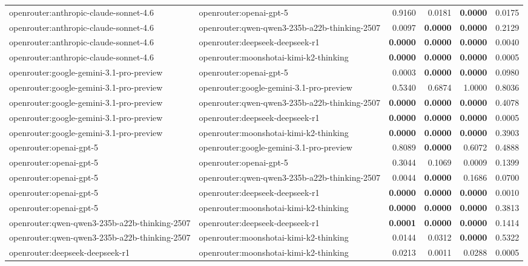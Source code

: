 \begin{table}[t]
\begin{tabular}{llrrrr}
openrouter:anthropic-claude-sonnet-4.6 & openrouter:openai-gpt-5 & 0.9160 & 0.0181 & \textbf{0.0000} & 0.0175 \\
openrouter:anthropic-claude-sonnet-4.6 & openrouter:qwen-qwen3-235b-a22b-thinking-2507 & 0.0097 & \textbf{0.0000} & \textbf{0.0000} & 0.2129 \\
openrouter:anthropic-claude-sonnet-4.6 & openrouter:deepseek-deepseek-r1 & \textbf{0.0000} & \textbf{0.0000} & \textbf{0.0000} & 0.0040 \\
openrouter:anthropic-claude-sonnet-4.6 & openrouter:moonshotai-kimi-k2-thinking & \textbf{0.0000} & \textbf{0.0000} & \textbf{0.0000} & 0.0005 \\
openrouter:google-gemini-3.1-pro-preview & openrouter:openai-gpt-5 & 0.0003 & \textbf{0.0000} & \textbf{0.0000} & 0.0980 \\
openrouter:google-gemini-3.1-pro-preview & openrouter:google-gemini-3.1-pro-preview & 0.5340 & 0.6874 & 1.0000 & 0.8036 \\
openrouter:google-gemini-3.1-pro-preview & openrouter:qwen-qwen3-235b-a22b-thinking-2507 & \textbf{0.0000} & \textbf{0.0000} & \textbf{0.0000} & 0.4078 \\
openrouter:google-gemini-3.1-pro-preview & openrouter:deepseek-deepseek-r1 & \textbf{0.0000} & \textbf{0.0000} & \textbf{0.0000} & 0.0005 \\
openrouter:google-gemini-3.1-pro-preview & openrouter:moonshotai-kimi-k2-thinking & \textbf{0.0000} & \textbf{0.0000} & \textbf{0.0000} & 0.3903 \\
openrouter:openai-gpt-5 & openrouter:google-gemini-3.1-pro-preview & 0.8089 & \textbf{0.0000} & 0.6072 & 0.4888 \\
openrouter:openai-gpt-5 & openrouter:openai-gpt-5 & 0.3044 & 0.1069 & 0.0009 & 0.1399 \\
openrouter:openai-gpt-5 & openrouter:qwen-qwen3-235b-a22b-thinking-2507 & 0.0044 & \textbf{0.0000} & 0.1686 & 0.0700 \\
openrouter:openai-gpt-5 & openrouter:deepseek-deepseek-r1 & \textbf{0.0000} & \textbf{0.0000} & \textbf{0.0000} & 0.0010 \\
openrouter:openai-gpt-5 & openrouter:moonshotai-kimi-k2-thinking & \textbf{0.0000} & \textbf{0.0000} & \textbf{0.0000} & 0.3813 \\
openrouter:qwen-qwen3-235b-a22b-thinking-2507 & openrouter:deepseek-deepseek-r1 & \textbf{0.0001} & \textbf{0.0000} & \textbf{0.0000} & 0.1414 \\
openrouter:qwen-qwen3-235b-a22b-thinking-2507 & openrouter:moonshotai-kimi-k2-thinking & 0.0144 & 0.0312 & \textbf{0.0000} & 0.5322 \\
openrouter:deepseek-deepseek-r1 & openrouter:moonshotai-kimi-k2-thinking & 0.0213 & 0.0011 & 0.0288 & 0.0005 \\
\bottomrule
\end{tabular}
\end{table}